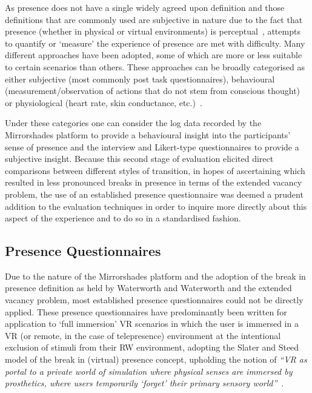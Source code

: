 As presence does not have a single widely agreed upon definition and those definitions that are commonly used are subjective in nature due to the fact that presence (whether in physical or virtual environments) is perceptual~\cite{Waterworth2014}, attempts to quantify or `measure' the experience of presence are met with difficulty. Many different approaches have been adopted, some of which are more or less suitable to certain scenarios than others. These approaches can be broadly categorised as either subjective (most commonly post task questionnaires), behavioural (measurement/observation of actions that do not stem from conscious thought) or physiological (heart rate, skin conductance, etc.)~\cite{Insko2003}.

Under these categories one can consider the log data recorded by the Mirrorshades platform to provide a behavioural insight into the participants' sense of presence and the interview and Likert-type questionnaires to provide a subjective insight. Because this second stage of evaluation elicited direct comparisons between different styles of transition, in hopes of ascertaining which resulted in less pronounced breaks in presence in terms of the extended vacancy problem, the use of an established presence questionnaire was deemed a prudent addition to the evaluation techniques in order to inquire more directly about this aspect of the experience and to do so in a standardised fashion.


\subsection{Presence Questionnaires}
\label{presence-questionnaires}
Due to the nature of the Mirrorshades platform and the adoption of the break in presence definition as held by Waterworth and Waterworth and the extended vacancy problem, most established presence questionnaires could not be directly applied. These presence questionnaires have predominantly been written for application to `full immersion' VR scenarios in which the user is immersed in a VR (or remote, in the case of telepresence) environment at the intentional exclusion of stimuli from their RW environment, adopting the Slater and Steed model of the break in (virtual) presence concept, upholding the notion of \textit{``VR as portal to a private world of simulation where physical senses are immersed by prosthetics, where users temporarily `forget' their primary sensory world''}~\cite{Heim2014}.

